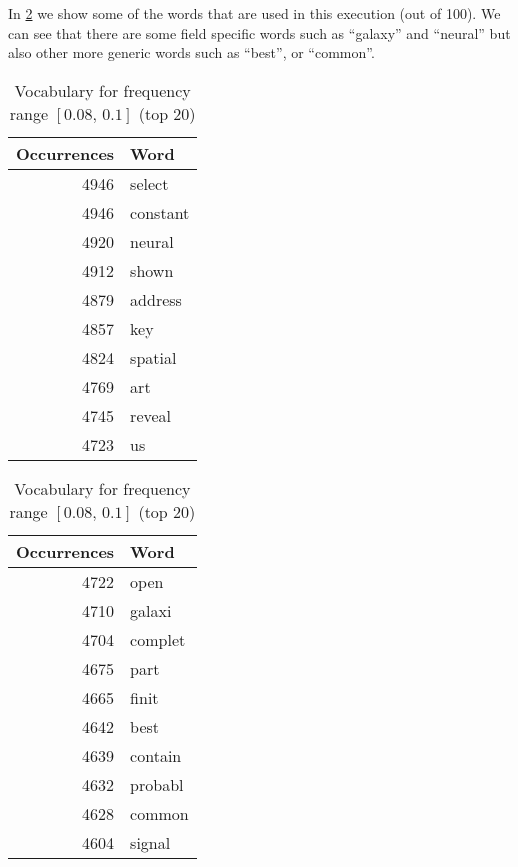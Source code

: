 In \cref{tab:vocabulary} we show some of the words that are used in this execution (out of 100). We can
see that there are some field specific words such as ``galaxy'' and ``neural'' but also other
more generic words such as ``best'', or ``common''.

\begin{table}[H]
	\caption{Vocabulary for frequency range $[0.08,\, 0.1]$ (top 20)}%
	\label{tab:vocabulary}%
	\begin{tabular}{rl}
		\toprule
		Occurrences & Word     \\
		\midrule
		4946        & select   \\
		4946        & constant \\
		4920        & neural   \\
		4912        & shown    \\
		4879        & address  \\
		4857        & key      \\
		4824        & spatial  \\
		4769        & art      \\
		4745        & reveal   \\
		4723        & us       \\
		\bottomrule
	\end{tabular}
	\hspace{2em}
	\begin{tabular}{rl}
		\toprule
		Occurrences & Word    \\
		\midrule
		4722        & open    \\
		4710        & galaxi  \\
		4704        & complet \\
		4675        & part    \\
		4665        & finit   \\
		4642        & best    \\
		4639        & contain \\
		4632        & probabl \\
		4628        & common  \\
		4604        & signal  \\
		\bottomrule
	\end{tabular}
\end{table}


